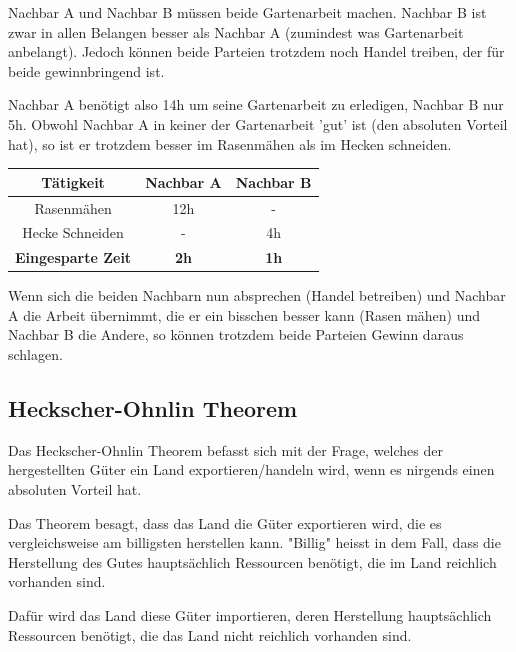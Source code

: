 \documentclass[a4paper, 11pt]{article}
\begin{document}
Nachbar A und Nachbar B müssen beide Gartenarbeit machen. Nachbar B ist zwar in allen Belangen besser als Nachbar A (zumindest was Gartenarbeit anbelangt). Jedoch können beide Parteien trotzdem noch Handel treiben, der für beide gewinnbringend ist.

\vspace{10px}

Nachbar A benötigt also 14h um seine Gartenarbeit zu erledigen, Nachbar B nur 5h. Obwohl Nachbar A in keiner der Gartenarbeit 'gut' ist (den absoluten Vorteil hat), so ist er trotzdem besser im Rasenmähen als im Hecken schneiden. 

\begin{table}
	\begin{tabular}{|c|c|c|}
		\hline
		\textbf{Tätigkeit} & \textbf{Nachbar A} & \textbf{Nachbar B} \\
		\hline
		Rasenmähen & 12h & - \\
		\hline
		Hecke Schneiden & - & 4h \\
		\hline
		\textbf{Eingesparte Zeit} & \textbf{2h} & \textbf{1h} \\
		\hline
	\end{tabular}
\end{table}

\noindent Wenn sich die beiden Nachbarn nun absprechen (Handel betreiben) und Nachbar A die Arbeit übernimmt, die er ein bisschen besser kann (Rasen mähen) und Nachbar B die Andere, so können trotzdem beide Parteien Gewinn daraus schlagen.

\vspace{10px}

\subsection{Heckscher-Ohnlin Theorem}

Das Heckscher-Ohnlin Theorem befasst sich mit der Frage, welches der hergestellten Güter ein Land exportieren/handeln wird, wenn es nirgends einen absoluten Vorteil hat. 

Das Theorem besagt, dass das Land die Güter exportieren wird, die es vergleichsweise am billigsten herstellen kann. "Billig" heisst in dem Fall, dass die Herstellung des Gutes hauptsächlich Ressourcen benötigt, die im Land reichlich vorhanden sind. 

Dafür wird das Land diese Güter importieren, deren Herstellung hauptsächlich Ressourcen benötigt, die das Land nicht reichlich vorhanden sind.
\end{document}
